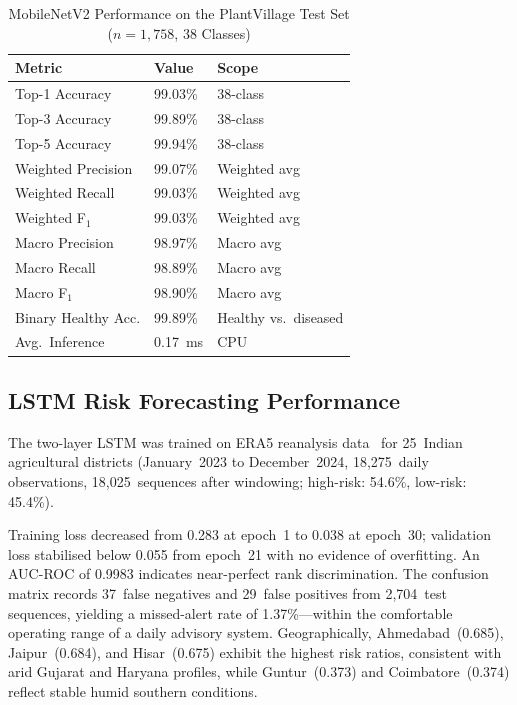 \documentclass[conference]{IEEEtran}
\begin{document}
\begin{table}[H]
\caption{MobileNetV2 Performance on the PlantVillage Test Set ($n{=}1{,}758$, 38 Classes)}
\label{tab:cnn_results}
\centering
\renewcommand{\arraystretch}{1.2}
\begin{tabular}{|p{3.4cm}|p{1.6cm}|p{1.8cm}|}
\hline
\textbf{Metric} & \textbf{Value} & \textbf{Scope} \\
\hline
Top-1 Accuracy      & 99.03\%  & 38-class \\
\hline
Top-3 Accuracy      & 99.89\%  & 38-class \\
\hline
Top-5 Accuracy      & 99.94\%  & 38-class \\
\hline
Weighted Precision  & 99.07\%  & Weighted avg \\
\hline
Weighted Recall     & 99.03\%  & Weighted avg \\
\hline
Weighted F$_1$      & 99.03\%  & Weighted avg \\
\hline
Macro Precision     & 98.97\%  & Macro avg \\
\hline
Macro Recall        & 98.89\%  & Macro avg \\
\hline
Macro F$_1$         & 98.90\%  & Macro avg \\
\hline
Binary Healthy Acc. & 99.89\%  & Healthy vs.\ diseased \\
\hline
Avg.\ Inference     & 0.17~ms  & CPU \\
\hline
\end{tabular}
\end{table}

\subsection{LSTM Risk Forecasting Performance}

The two-layer LSTM was trained on ERA5 reanalysis data~\cite{b21} for 25~Indian agricultural districts (January~2023 to December~2024, 18,275~daily observations, 18,025~sequences after windowing; high-risk: 54.6\%, low-risk: 45.4\%).

Training loss decreased from 0.283 at epoch~1 to 0.038 at epoch~30; validation loss stabilised below 0.055 from epoch~21 with no evidence of overfitting. An AUC-ROC of 0.9983 indicates near-perfect rank discrimination. The confusion matrix records 37~false negatives and 29~false positives from 2,704~test sequences, yielding a missed-alert rate of 1.37\%---within the comfortable operating range of a daily advisory system. Geographically, Ahmedabad~(0.685), Jaipur~(0.684), and Hisar~(0.675) exhibit the highest risk ratios, consistent with arid Gujarat and Haryana profiles, while Guntur~(0.373) and Coimbatore~(0.374) reflect stable humid southern conditions.
\end{document}
